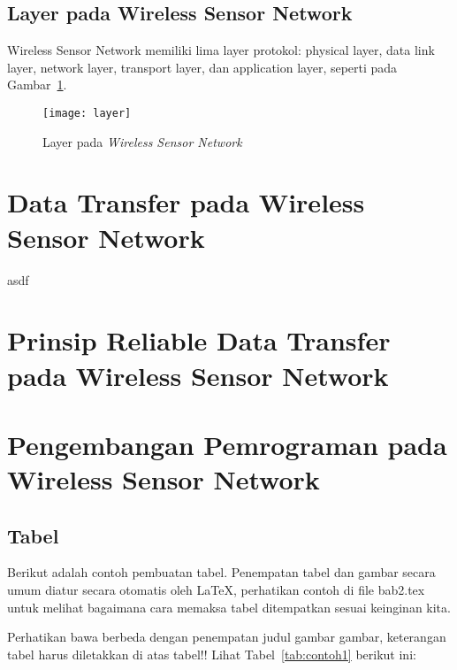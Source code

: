 \subsection{Layer pada Wireless Sensor Network}
Wireless Sensor Network memiliki lima layer protokol: physical layer, data link layer, network layer, transport layer, dan application layer, seperti pada Gambar~\ref{fig:layer}. 
\begin{figure} [H]
	\centering  
	\texttt{[image: layer]}  
	\caption[Layer pada \textit{Wireless Sensor Network}]{Layer pada \textit{Wireless Sensor Network}} 
	\label{fig:layer} 
\end{figure} 

\section{Data Transfer pada Wireless Sensor Network} 
asdf
 
\section{Prinsip Reliable Data Transfer pada Wireless Sensor Network}
\label{sec:reliable}

 
\section{Pengembangan Pemrograman pada Wireless Sensor Network}
\label{sec:pemrograman_wsn}


\newpage
\subsection{Tabel}  
Berikut adalah contoh pembuatan tabel. 
Penempatan tabel dan gambar secara umum diatur secara otomatis oleh \LaTeX{}, perhatikan contoh di file bab2.tex untuk melihat bagaimana cara memaksa tabel ditempatkan sesuai keinginan kita.

Perhatikan bawa berbeda dengan penempatan judul gambar gambar, keterangan tabel harus diletakkan di atas tabel!!
Lihat Tabel~\ref{tab:contoh1} berikut ini:

